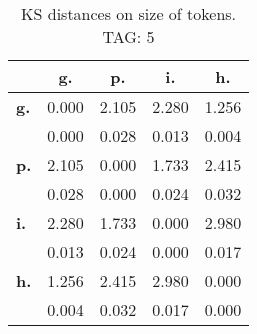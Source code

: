 \begin{table}[h!]
\begin{center}
\begin{tabular}{| l || c | c | c | c |}\hline
 & {\bf g.} & {\bf p.} & {\bf i.} & {\bf h.} \\\hline\hline
{\bf g.} & 0.000 & 2.105 & 2.280 & 1.256 \\
{\bf } & 0.000 & 0.028 & 0.013 & 0.004 \\\hline
{\bf p.} & 2.105 & 0.000 & 1.733 & 2.415 \\
{\bf } & 0.028 & 0.000 & 0.024 & 0.032 \\\hline
{\bf i.} & 2.280 & 1.733 & 0.000 & 2.980 \\
{\bf } & 0.013 & 0.024 & 0.000 & 0.017 \\\hline
{\bf h.} & 1.256 & 2.415 & 2.980 & 0.000 \\
{\bf } & 0.004 & 0.032 & 0.017 & 0.000 \\\hline
\end{tabular}
\caption{KS distances on size of tokens. TAG: 5}
\end{center}
\end{table}
